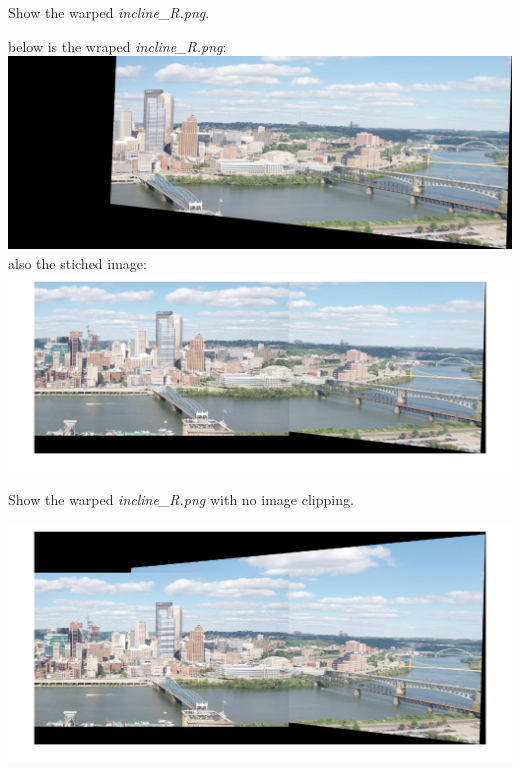 \documentclass[12pt,letterpaper,boxed]{hmcpset}
\begin{document}
\begin{problem}[5.1]
Show the warped \textit{incline\_R.png}.
\end{problem}

\begin{solution}
  below is the wraped \textit{incline\_R.png}:\\
  \includegraphics[width=\textwidth]{q5_1.jpg}\\
  also the stiched image:\\
    \includegraphics[width=\textwidth]{q5_1_2.jpg}\\
\end{solution}

\begin{problem}[5.2]
Show the warped \textit{incline\_R.png} with no image clipping.
\end{problem}

\begin{solution}
  \includegraphics[width=\textwidth]{q5_2_pan.jpg}\\
\end{solution}
\end{document}
